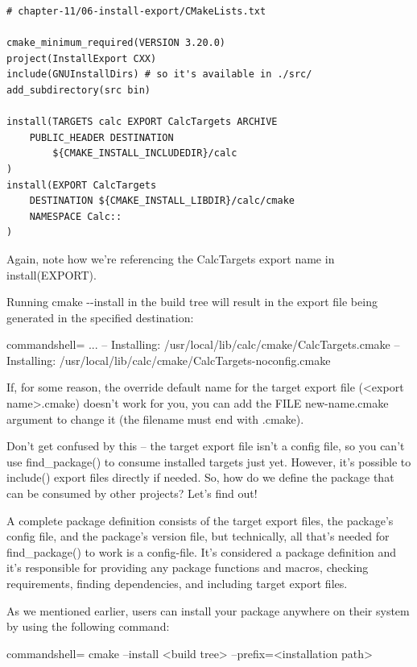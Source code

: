 \begin{lstlisting}[style=styleCMake]
# chapter-11/06-install-export/CMakeLists.txt

cmake_minimum_required(VERSION 3.20.0)
project(InstallExport CXX)
include(GNUInstallDirs) # so it's available in ./src/
add_subdirectory(src bin)

install(TARGETS calc EXPORT CalcTargets ARCHIVE
	PUBLIC_HEADER DESTINATION
		${CMAKE_INSTALL_INCLUDEDIR}/calc
)
install(EXPORT CalcTargets
	DESTINATION ${CMAKE_INSTALL_LIBDIR}/calc/cmake
	NAMESPACE Calc::
)
\end{lstlisting}

Again, note how we're referencing the CalcTargets export name in install(EXPORT).

Running cmake -{}-install in the build tree will result in the export file being generated in the specified destination:

\begin{tcblisting}{commandshell={}}
...
-- Installing: /usr/local/lib/calc/cmake/CalcTargets.cmake
-- Installing: /usr/local/lib/calc/cmake/CalcTargets-noconfig.cmake
\end{tcblisting}

If, for some reason, the override default name for the target export file (<export name>.cmake) doesn't work for you, you can add the FILE new-name.cmake argument to change it (the filename must end with .cmake).

Don't get confused by this – the target export file isn't a config file, so you can't use find\_package() to consume installed targets just yet. However, it's possible to include() export files directly if needed. So, how do we define the package that can be consumed by other projects? Let's find out!


A complete package definition consists of the target export files, the package's config file, and the package's version file, but technically, all that's needed for find\_package() to work is a config-file. It's considered a package definition and it's responsible for providing any package functions and macros, checking requirements, finding dependencies, and including target export files.

As we mentioned earlier, users can install your package anywhere on their system by using the following command:

\begin{tcblisting}{commandshell={}}
cmake --install <build tree> --prefix=<installation path>
\end{tcblisting}

